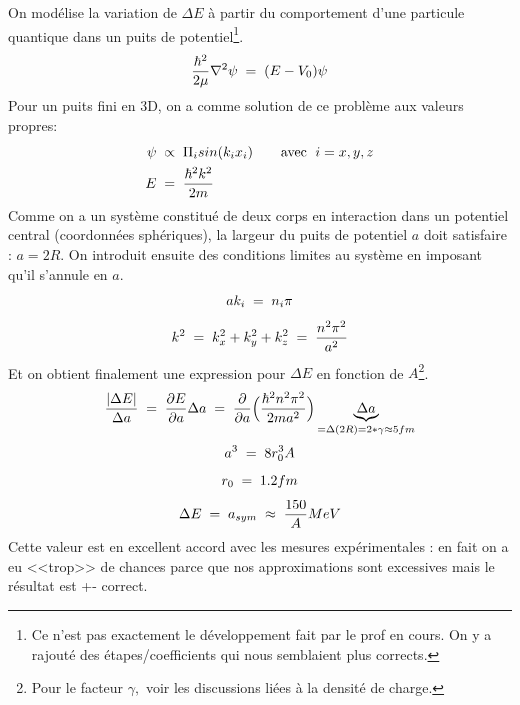 On modélise la variation de $\Delta E$ à partir du comportement d'une particule quantique dans un puits de potentiel\footnote{Ce n'est pas exactement le développement fait par le prof en cours. On y a rajouté des étapes/coefficients qui nous semblaient plus corrects.}.\\
\begin{equation*}
    \dfrac{\hbar^2}{2\mu}\nabla^2 \psi \; = \; (E- V_0)\psi
\end{equation*}
Pour un puits fini en 3D, on a comme solution de ce problème aux valeurs propres:
\begin{align*}
    \psi &\;\propto\; 
    \Pi_i sin(k_i x_i) \qquad \text{avec }\; i ={x,y,z}\\
    E &\; = \; \dfrac{\hbar^2 k^2}{2m}
\end{align*}
Comme on a un système constitué de deux corps en interaction dans un potentiel central (coordonnées sphériques), la largeur du puits de potentiel $a$ doit satisfaire : $a = 2R$. On introduit ensuite des conditions limites au système en imposant qu'il s'annule en $a$.
\begin{equation*}
    ak_i \; = \; n_i \pi
\end{equation*}
\begin{equation*}
    k^2 \; = \; k_x^2 + k_y^2 + k_z^2 \; = \; \dfrac{n^2\pi^2}{a^2}
\end{equation*}
Et on obtient finalement une expression pour $\Delta E$ en fonction de $A$\footnote{Pour le facteur $\gamma,$ voir les discussions liées à la densité de charge.}.
\begin{equation*}
    \dfrac{|\Delta E|}{\Delta a} 
    \; = \; \dfrac{\partial E}{\partial a}\Delta a
    \; = \; \dfrac{\partial}{\partial a}\Big( \dfrac{\hbar^2n^2\pi^2}{2ma^2}\Big)\underbrace{\Delta a}_{=\Delta(2R)= 2*\gamma\approx 5fm}
\end{equation*}
\begin{equation*}
    a^3 \; = \; 8r_0^3 A
\end{equation*}
\begin{equation*}
    r_0 \; = \; 1.2fm
\end{equation*}
\begin{equation*}
    \Delta E \; = \; a_{sym} \;\approx\; \dfrac{150}{A}MeV
\end{equation*}
Cette valeur est en excellent accord avec les mesures expérimentales : en fait on a eu <<trop>> de chances parce que nos approximations sont excessives mais le résultat est +- correct.






